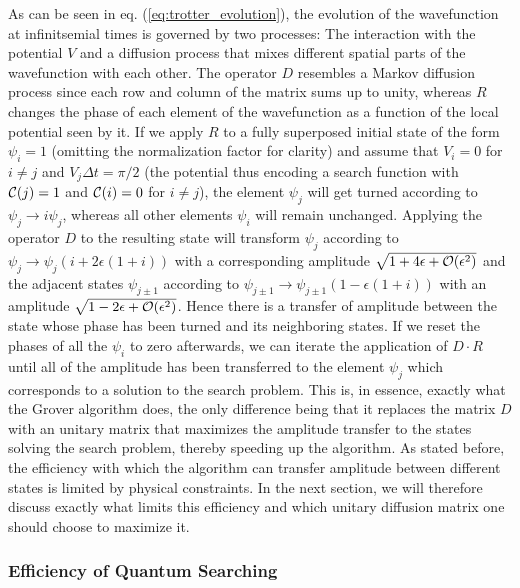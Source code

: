 \smallskip

As can be seen in eq. (\ref{eq:trotter_evolution}), the evolution of the wavefunction at infinitsemial times is governed by two processes: The interaction with the potential $V$ and a diffusion process that mixes different spatial parts of the wavefunction with each other. The operator $D$ resembles a Markov diffusion process since each row and column of the matrix sums up to unity, whereas $R$ changes the phase of each element of the wavefunction as a function of the local potential seen by it. If we apply $R$ to a fully superposed initial state of the form $\psi_i = 1$ (omitting the normalization factor for clarity) and assume that $V_i = 0$ for $i \ne j$ and $V_j \Delta t = \pi/2$ (the potential thus encoding a search function with $\Or(j)=1$ and $\Or(i)=0$ for $i\ne j$), the element $\psi_j$ will get turned according to $\psi_j \to i\psi_j $, whereas all other elements $\psi_i$ will remain unchanged. Applying the operator $D$ to the resulting state will transform $\psi_j$ according to $\psi_j \to \psi_j(i+2\epsilon(1+i))$ with a corresponding amplitude $\sqrt{1+4\epsilon+\begin{mathcal}O\end{mathcal}(\epsilon^2)}$ and the adjacent states $\psi_{j\pm 1}$ according to $\psi_{j\pm 1} \to \psi_{j\pm 1}(1-\epsilon(1+i))$ with an amplitude $\sqrt{1-2\epsilon +\begin{mathcal}O\end{mathcal}(\epsilon^2)}$. Hence there is a transfer of amplitude between the state whose phase has been turned and its neighboring states. If we reset the phases of all the $\psi_i$ to zero afterwards, we can iterate the application of $D\cdot R$ until all of the amplitude has been transferred to the element $\psi_j$ which corresponds to a solution to the search problem. This is, in essence, exactly what the Grover algorithm does, the only difference being that it replaces the matrix $D$ with an unitary matrix that maximizes the amplitude transfer to the states solving the search problem, thereby speeding up the algorithm. As stated before, the efficiency with which the algorithm can transfer amplitude between different states is limited by physical constraints. In the next section, we will therefore discuss exactly what limits this efficiency and which unitary diffusion matrix one should choose to maximize it.

\subsubsection{Efficiency of Quantum Searching}

